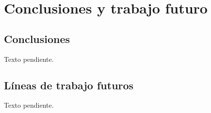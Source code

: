 \section{Conclusiones y trabajo futuro}

\subsection{Conclusiones}
Texto pendiente.

\subsection{Líneas de trabajo futuros}
Texto pendiente.
